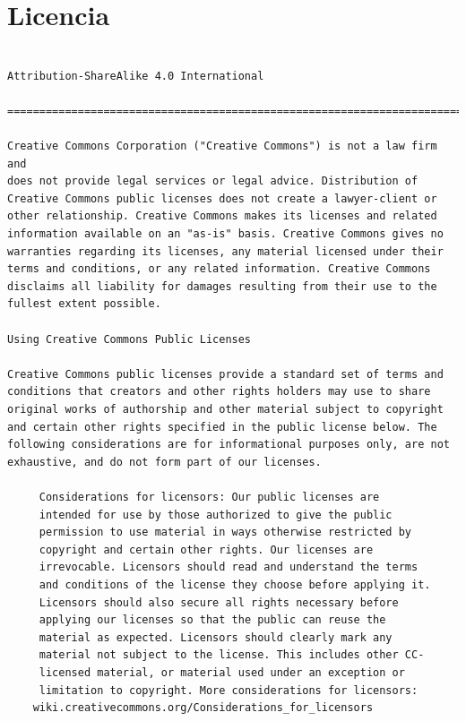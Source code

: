 \documentclass[12pt,spanish,]{article}
\begin{document}
\section{Licencia}\label{licencia}

\begin{verbatim}

Attribution-ShareAlike 4.0 International

=======================================================================

Creative Commons Corporation ("Creative Commons") is not a law firm and
does not provide legal services or legal advice. Distribution of
Creative Commons public licenses does not create a lawyer-client or
other relationship. Creative Commons makes its licenses and related
information available on an "as-is" basis. Creative Commons gives no
warranties regarding its licenses, any material licensed under their
terms and conditions, or any related information. Creative Commons
disclaims all liability for damages resulting from their use to the
fullest extent possible.

Using Creative Commons Public Licenses

Creative Commons public licenses provide a standard set of terms and
conditions that creators and other rights holders may use to share
original works of authorship and other material subject to copyright
and certain other rights specified in the public license below. The
following considerations are for informational purposes only, are not
exhaustive, and do not form part of our licenses.

     Considerations for licensors: Our public licenses are
     intended for use by those authorized to give the public
     permission to use material in ways otherwise restricted by
     copyright and certain other rights. Our licenses are
     irrevocable. Licensors should read and understand the terms
     and conditions of the license they choose before applying it.
     Licensors should also secure all rights necessary before
     applying our licenses so that the public can reuse the
     material as expected. Licensors should clearly mark any
     material not subject to the license. This includes other CC-
     licensed material, or material used under an exception or
     limitation to copyright. More considerations for licensors:
    wiki.creativecommons.org/Considerations_for_licensors


\end{verbatim}
\end{document}
